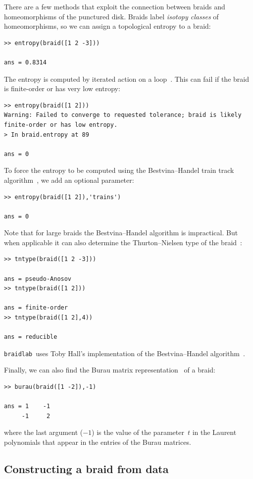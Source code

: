 \documentclass[12pt]{article}
\newcommand{\braidlab}{\texttt{braidlab}}%
\begin{document}
There are a few methods that exploit the connection between braids and
homeomorphisms of the punctured disk.  Braids label \emph{isotopy
  classes} of homeomorphisms, so we can assign a topological entropy
to a braid:
\begin{lstlisting}[frame=single,framerule=0pt]
>> entropy(braid([1 2 -3]))

ans = 0.8314
\end{lstlisting}
The entropy is computed by iterated action on a
loop~\citep{Moussafir2006}.  This can fail if the braid is
finite-order or has very low entropy:
\begin{lstlisting}[frame=single,framerule=0pt]
>> entropy(braid([1 2]))
Warning: Failed to converge to requested tolerance; braid is likely finite-order or has low entropy. 
> In braid.entropy at 89

ans = 0
\end{lstlisting}
To force the entropy to be computed using
the Bestvina--Handel train track algorithm~\cite{Bestvina1995}, we add
an optional parameter:
\begin{lstlisting}[frame=single,framerule=0pt]
>> entropy(braid([1 2]),'trains')

ans = 0
\end{lstlisting}
Note that for large braids the Bestvina--Handel algorithm is
impractical.  But when applicable it can also determine the
Thurton--Nielsen type of the
braid~\citep{Fathi1979,Thurston1988,Casson1988,Boyland1994}:
\begin{lstlisting}[frame=single,framerule=0pt]
>> tntype(braid([1 2 -3]))

ans = pseudo-Anosov
>> tntype(braid([1 2]))

ans = finite-order
>> tntype(braid([1 2],4))

ans = reducible
\end{lstlisting}
\braidlab\ uses Toby Hall's implementation of the Bestvina--Handel
algorithm~\citep{HallTrain}.

Finally, we can also find the Burau matrix
representation~\citep{Burau1936,Birman1975} of a braid:
\begin{lstlisting}[frame=single,framerule=0pt]
>> burau(braid([1 -2]),-1)

ans = 1    -1
     -1     2
\end{lstlisting}
where the last argument ($-1$) is the value of the parameter~$t$ in
the Laurent polynomials that appear in the entries of the Burau
matrices.


\subsection{Constructing a braid from data}
\label{sec:braidfromdata}
\end{document}
